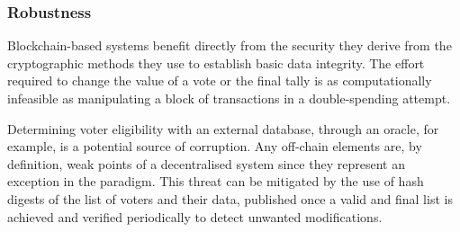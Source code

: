 \documentclass[../main.tex]{subfiles}
\begin{document}
\subsubsection{Robustness}
\label{sec:robustness}
Blockchain-based systems benefit directly from the security they derive from the cryptographic methods they use to establish basic data integrity. The effort required to change the value of a vote or the final tally is as computationally infeasible as manipulating a block of transactions in a double-spending attempt.
\par
Determining voter eligibility with an external database, through an oracle, for example, is a potential source of corruption. Any off-chain elements are, by definition, weak points of a decentralised system since they represent an exception in the paradigm. This threat can be mitigated by the use of hash digests of the list of voters and their data, published once a valid and final list is achieved and verified periodically to detect unwanted modifications.
\end{document}
